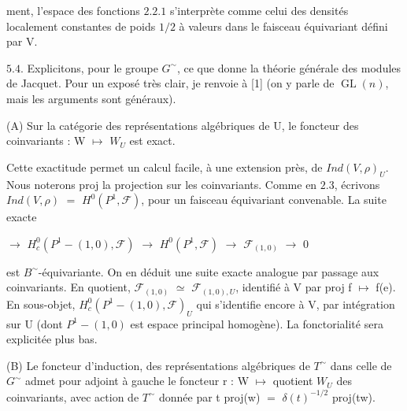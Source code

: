 \documentclass[10pt,a4paper]{article}
\begin{document}
\clearpage
{}
\label{d035-physical-022}
\par ment, l'espace des fonctions $2.2.1$ s'interprète comme celui des densités localement constantes de poids $1/2$ à valeurs dans le faisceau équivariant défini par V.\par
\par $5.4$. Explicitons, pour le groupe $G^\sim$, ce que donne la théorie générale des modules de Jacquet. Pour un exposé très clair, je renvoie à [1] (on y parle de $\operatorname{GL}(n)$, mais les arguments sont généraux).\par
\par (A) Sur la catégorie des représentations algébriques de U, le foncteur des coinvariants : W $\mapsto{}$ $W_U$ est exact.\par
\par Cette exactitude permet un calcul facile, à une extension près, de $Ind(V,\rho{})_U$. Nous noterons proj la projection sur les coinvariants. Comme en $2.3$, écrivons $Ind(V,\rho{})$ $=$ $H^0(P^1,\mathcal{F})$, pour un faisceau équivariant convenable. La suite exacte\par
\par\smallskip\begin{center}\begin{minipage}{0.96\textwidth} $\to{}$ $H_c^0(P^1-{(1,0)},\mathcal{F})$ $\to{}$ $H^0(P^1,\mathcal{F})$ $\to{}$ $\mathcal{F}_{(1,0)}$ $\to{}$ 0
\end{minipage}\end{center}\smallskip
\par est $B^\sim$-équivariante. On en déduit une suite exacte analogue par passage aux coinvariants. En quotient, $\mathcal{F}_{(1,0)}$ $\simeq{}$ $\mathcal{F}_{(1,0),U}$, identifié à V par proj f $\mapsto{}$ f(e). En sous-objet, $H_c^0(P^1-{(1,0)},\mathcal{F})_U$ qui s'identifie encore à V, par intégration sur U (dont $P^1-{(1,0)}$ est espace principal homogène). La fonctorialité sera explicitée plus bas.\par
\par (B) Le foncteur d'induction, des représentations algébriques de $T^\sim$ dans celle de $G^\sim$ admet pour adjoint à gauche le foncteur r : W $\mapsto{}$ quotient $W_U$ des coinvariants, avec action de $T^\sim$ donnée par t proj(w) $=$ $\delta{}(t)^{-1/2}$ proj(tw).\par
\end{document}

